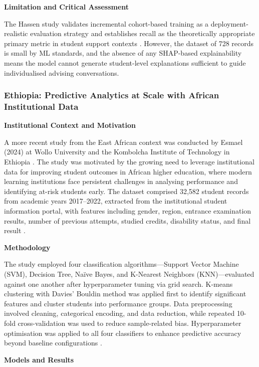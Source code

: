 \documentclass[12pt]{report}
\begin{document}
\textbf{Limitation and Critical Assessment}

The Hassen study validates incremental cohort-based training as a deployment-realistic evaluation strategy and establishes recall as the theoretically appropriate primary metric in student support contexts \parencite{hassen2020}. However, the dataset of 728 records is small by ML standards, and the absence of any SHAP-based explainability means the model cannot generate student-level explanations sufficient to guide individualised advising conversations.

\subsubsection{Ethiopia: Predictive Analytics at Scale with African 
Institutional Data}



\textbf{Institutional Context and Motivation}

A more recent study from the East African context was conducted by 
Esmael (2024) at Wollo University and the Kombolcha Institute of 
Technology in Ethiopia \parencite{esmael2024}. The study was motivated 
by the growing need to leverage institutional data for improving student 
outcomes in African higher education, where modern learning institutions 
face persistent challenges in analysing performance and identifying 
at-risk students early. The dataset comprised 32,582 student records 
from academic years 2017--2022, extracted from the institutional student 
information portal, with features including gender, region, entrance 
examination results, number of previous attempts, studied credits, 
disability status, and final result \parencite{esmael2024}.

\textbf{Methodology}

The study employed four classification algorithms---Support Vector 
Machine (SVM), Decision Tree, Naïve Bayes, and K-Nearest Neighbors 
(KNN)---evaluated against one another after hyperparameter tuning via 
grid search. K-means clustering with Davies' Bouldin method was applied 
first to identify significant features and cluster students into 
performance groups. Data preprocessing involved cleaning, categorical 
encoding, and data reduction, while repeated 10-fold cross-validation 
was used to reduce sample-related bias. Hyperparameter optimisation 
was applied to all four classifiers to enhance predictive accuracy 
beyond baseline configurations \parencite{esmael2024}.

 \textbf{Models and Results}
\end{document}
